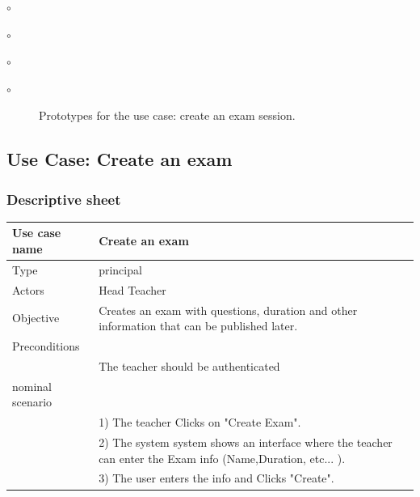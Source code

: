 \documentclass[]{uc2pfecaneva}
\begin{document}
\begin{list}{$\circ$}{}
\begin{list}{$\circ$}{}
\begin{list}{$\circ$}{}
\begin{list}{$\circ$}{}
\begin{figure}[h]
        \caption{Prototypes for the use case: create an exam session.}
    \end{figure}
    \clearpage








    \raggedright\subsection{Use Case: Create an exam}
    \subsubsection{Descriptive sheet}
    \begin{table}[h]
        \centering
        \begin{tabularx}{\textwidth}{|l|X|}
            \hline
            Use case name         & Create an exam                                                                                              \\ \hline
            Type                  & principal                                                                                                   \\ \hline
            Actors                & Head Teacher                                                                                                \\ \hline
            Objective             & Creates an exam with questions, duration and other information that can be published later.                 \\ \hline
            Preconditions         &                                                                                                             \\
            & The teacher should be authenticated                                                                         \\ \hline
            nominal scenario      &                                                                                                             \\
            & 1) The teacher Clicks on "Create Exam".                                                                     \\
            & 2) The system system shows an interface where the teacher can enter the Exam info (Name,Duration, etc... ). \\
            & 3) The user enters the info and Clicks "Create".                                                            \\

\end{tabularx}
\end{table}
\end{list}
\end{list}
\end{list}
\end{list}
\end{document}
